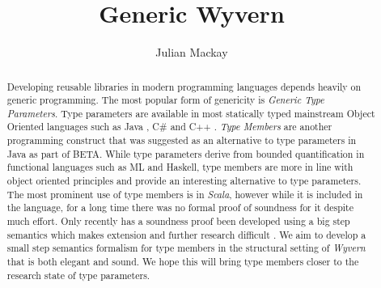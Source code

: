 \documentclass[11pt
              , a4paper
              , twoside
              , openright
              ]{report}
\title{Generic Wyvern}
\author{Julian Mackay}
\date{}
\numberwithin{case}{theorem}
\numberwithin{subcase}{case}
\begin{document}
\frontmatter



\begin{abstract}
Developing reusable libraries in modern programming languages depends heavily on generic programming. The most popular form of genericity is \emph{Generic Type Parameters}. Type parameters are available in most statically typed mainstream Object Oriented languages such as Java \cite{Gosling:2014:JLS:2636997}, C\# \cite{Hejlsberg:2010:CPL:1951915} and C++ \cite{Stroustrup:2000:CPL:518791}. \emph{Type Members} are another programming construct that was suggested as an alternative to type parameters in Java \cite{Thorup97genericityin} as part of BETA\cite{Madsen:1989:VCP:74877.74919}. While type parameters derive from bounded quantification in functional languages such as ML and Haskell\cite{Canning:1989:FPO:99370.99392, Igarashi1999}, type members are more in line with object oriented principles and provide an interesting alternative to type parameters. The most prominent use of type members is in \emph{Scala}\cite{scaladocs2016}, however while it is included in the language, for a long time there was no formal proof of soundness for it despite much effort\cite{amin:fool:2012,Odersky2003}. Only recently has a soundness proof been developed using a big step semantics \cite{Amin:2014:FPT:2660193.2660216} which makes extension and further research difficult . We aim to develop a small step semantics formalism for type members in the structural setting of \emph{Wyvern}\cite{Nistor:2013:WST:2489828.2489830,Omar2014} that is both elegant and sound. We hope this will bring type members closer to the research state of type parameters. 
\end{abstract}


\maketitle



\tableofcontents


\end{document}
